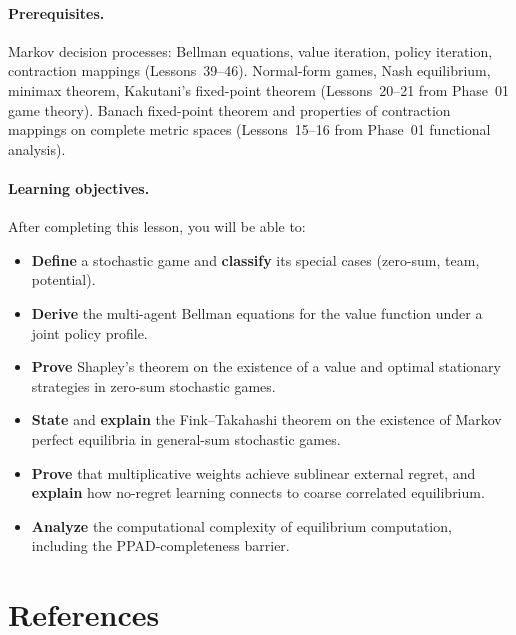 \documentclass[11pt,a4paper]{article}
\begin{document}
\paragraph{Prerequisites.}
Markov decision processes: Bellman equations, value iteration, policy
iteration, contraction mappings (Lessons~39--46).  Normal-form games,
Nash equilibrium, minimax theorem, Kakutani's fixed-point theorem
(Lessons~20--21 from Phase~01 game theory).  Banach fixed-point
theorem and properties of contraction mappings on complete metric
spaces (Lessons~15--16 from Phase~01 functional analysis).

\paragraph{Learning objectives.}
After completing this lesson, you will be able to:
\begin{itemize}[nosep]
  \item \textbf{Define} a stochastic game and \textbf{classify}
    its special cases (zero-sum, team, potential).
  \item \textbf{Derive} the multi-agent Bellman equations for
    the value function under a joint policy profile.
  \item \textbf{Prove} Shapley's theorem on the existence of a
    value and optimal stationary strategies in zero-sum stochastic
    games.
  \item \textbf{State} and \textbf{explain} the Fink--Takahashi
    theorem on the existence of Markov perfect equilibria in
    general-sum stochastic games.
  \item \textbf{Prove} that multiplicative weights achieve
    sublinear external regret, and \textbf{explain} how no-regret
    learning connects to coarse correlated equilibrium.
  \item \textbf{Analyze} the computational complexity of equilibrium
    computation, including the PPAD-completeness barrier.
\end{itemize}

\section{References}
\label{sec:references}
\end{document}
